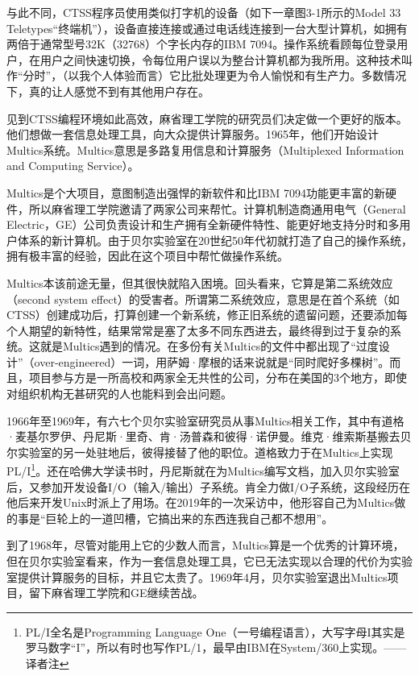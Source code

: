 \documentclass[a4paper,12pt,UTF8,twoside]{ctexbook}
\begin{document}
与此不同，CTSS程序员使用类似打字机的设备（如下一章图3-1所示的Model 33 Teletypes“终端机”），设备直接连接或通过电话线连接到一台大型计算机，如拥有两倍于通常型号32K（32768）个字长内存的IBM 7094。操作系统看顾每位登录用户，在用户之间快速切换，令每位用户误以为整台计算机都为我所用。这种技术叫作“分时”，（以我个人体验而言）它比批处理更为令人愉悦和有生产力。多数情况下，真的让人感觉不到有其他用户存在。

见到CTSS编程环境如此高效，麻省理工学院的研究员们决定做一个更好的版本。他们想做一套信息处理工具，向大众提供计算服务。1965年，他们开始设计Multics系统。Multics意思是多路复用信息和计算服务（Multiplexed Information and Computing Service）。

Multics是个大项目，意图制造出强悍的新软件和比IBM 7094功能更丰富的新硬件，所以麻省理工学院邀请了两家公司来帮忙。计算机制造商通用电气（General Electric，GE）公司负责设计和生产拥有全新硬件特性、能更好地支持分时和多用户体系的新计算机。由于贝尔实验室在20世纪50年代初就打造了自己的操作系统，拥有极丰富的经验，因此在这个项目中帮忙做操作系统。

Multics本该前途无量，但其很快就陷入困境。回头看来，它算是第二系统效应（second system effect）的受害者。所谓第二系统效应，意思是在首个系统（如CTSS）创建成功后，打算创建一个新系统，修正旧系统的遗留问题，还要添加每个人期望的新特性，结果常常是塞了太多不同东西进去，最终得到过于复杂的系统。这就是Multics遇到的情况。在多份有关Multics的文件中都出现了“过度设计”（over-engineered）一词，用萨姆·摩根的话来说就是“同时爬好多棵树”。而且，项目参与方是一所高校和两家全无共性的公司，分布在美国的3个地方，即使对组织机构无甚研究的人也能料到会出问题。

1966年至1969年，有六七个贝尔实验室研究员从事Multics相关工作，其中有道格·麦基尔罗伊、丹尼斯·里奇、肯·汤普森和彼得·诺伊曼。维克·维索斯基搬去贝尔实验室的另一处驻地后，彼得接替了他的职位。道格致力于在Multics上实现PL/I\footnote{PL/I全名是Programming Language One（一号编程语言），大写字母I其实是罗马数字“I”，所以有时也写作PL/1，最早由IBM在System/360上实现。——译者注}。还在哈佛大学读书时，丹尼斯就在为Multics编写文档，加入贝尔实验室后，又参加开发设备I/O（输入/输出）子系统。肯全力做I/O子系统，这段经历在他后来开发Unix时派上了用场。在2019年的一次采访中，他形容自己为Multics做的事是“巨轮上的一道凹槽，它搞出来的东西连我自己都不想用”。

到了1968年，尽管对能用上它的少数人而言，Multics算是一个优秀的计算环境，但在贝尔实验室看来，作为一套信息处理工具，它已无法实现以合理的代价为实验室提供计算服务的目标，并且它太贵了。1969年4月，贝尔实验室退出Multics项目，留下麻省理工学院和GE继续苦战。
\end{document}
